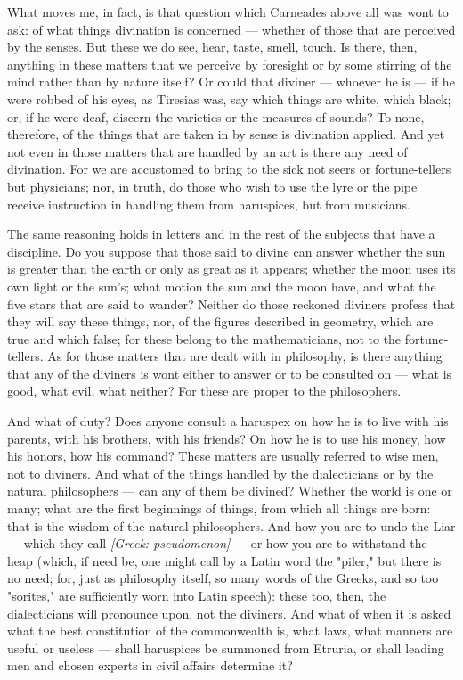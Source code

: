  What moves me, in fact, is that question which Carneades above all was wont to ask: of what things divination is concerned — whether of those that are perceived by the senses. But these we do see, hear, taste, smell, touch. Is there, then, anything in these matters that we perceive by foresight or by some stirring of the mind rather than by nature itself? Or could that diviner — whoever he is — if he were robbed of his eyes, as Tiresias was, say which things are white, which black; or, if he were deaf, discern the varieties or the measures of sounds? To none, therefore, of the things that are taken in by sense is divination applied. And yet not even in those matters that are handled by an art is there any need of divination. For we are accustomed to bring to the sick not seers or fortune-tellers but physicians; nor, in truth, do those who wish to use the lyre or the pipe receive instruction in handling them from haruspices, but from musicians.

 The same reasoning holds in letters and in the rest of the subjects that have a discipline. Do you suppose that those said to divine can answer whether the sun is greater than the earth or only as great as it appears; whether the moon uses its own light or the sun's; what motion the sun and the moon have, and what the five stars that are said to wander? Neither do those reckoned diviners profess that they will say these things, nor, of the figures described in geometry, which are true and which false; for these belong to the mathematicians, not to the fortune-tellers. As for those matters that are dealt with in philosophy, is there anything that any of the diviners is wont either to answer or to be consulted on — what is good, what evil, what neither? For these are proper to the philosophers.

 And what of duty? Does anyone consult a haruspex on how he is to live with his parents, with his brothers, with his friends? On how he is to use his money, how his honors, how his command? These matters are usually referred to wise men, not to diviners. And what of the things handled by the dialecticians or by the natural philosophers — can any of them be divined? Whether the world is one or many; what are the first beginnings of things, from which all things are born: that is the wisdom of the natural philosophers. And how you are to undo the Liar — which they call \textit{[Greek: pseudomenon]} — or how you are to withstand the heap (which, if need be, one might call by a Latin word the "piler," but there is no need; for, just as philosophy itself, so many words of the Greeks, and so too "sorites," are sufficiently worn into Latin speech): these too, then, the dialecticians will pronounce upon, not the diviners. And what of when it is asked what the best constitution of the commonwealth is, what laws, what manners are useful or useless — shall haruspices be summoned from Etruria, or shall leading men and chosen experts in civil affairs determine it?

